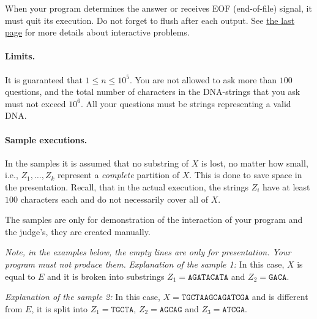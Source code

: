 When your program determines the answer or receives EOF (end-of-file) signal, it must quit its execution.
Do not forget to flush after each output.
See \hyperlink{info-interactive}{the last page} for more details about interactive problems.

\paragraph{Limits.}
It is guaranteed that $1 \leq n \leq 10^5$.
You are not allowed to ask more than $100$ questions, and the total number of characters in the DNA-strings that you ask must not exceed $10^6$.
All your questions must be strings representing a valid DNA.

\paragraph{Sample executions.}
In the samples it is assumed that no substring of $X$ is lost, no matter how small, i.e., $Z_1, \dots, Z_k$ represent a \emph{complete} partition of $X$.
This is done to save space in the presentation.
Recall, that in the actual execution, the strings $Z_i$ have at least $100$ characters each and do not necessarily cover all of $X$.

The samples are only for demonstration of the interaction of your program and the judge's, they are created manually.

\emph{Note, in the examples below, the empty lines are only for presentation.
Your program must not produce them.}
{
\renewcommand{\sampleinputname}{Laboratory's feedback}
\renewcommand{\sampleoutputname}{Your questions}
}
\emph{Explanation of the sample 1:}
In this case, $X$ is equal to $E$ and it is broken into substrings $Z_1 = \texttt{AGATACATA}$ and $Z_2 = \texttt{GACA}$.

{
\renewcommand{\sampleinputname}{Laboratory's feedback}
\renewcommand{\sampleoutputname}{Your questions}
}
\emph{Explanation of the sample 2:}
In this case, $X = \texttt{TGCTAAGCAGATCGA}$ and is different from $E$, it is split into $Z_1 = \texttt{TGCTA}$, $Z_2 = \texttt{AGCAG}$ and $Z_3 = \texttt{ATCGA}$.